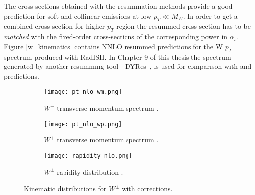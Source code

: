 	 The cross-sections obtained with the resummation methods provide a good prediction for soft and collinear emissions at low $p_T\ll M_W$. In order to get a combined cross-section for higher $p_T$ region the resummed cross-section has to be \textit{matched} with the fixed-order cross-sections of the corresponding power in $\alpha_s$. Figure \ref{w_kinematics} contains NNLO resummed predictions for the W $p_T$ spectrum produced with RadISH\cite{Radish}. In Chapter 9 of this thesis the spectrum generated by another resumming tool - DYRes~\cite{dyres}, is used for comparison with \Powheg and \Sherpa predictions.
	 \begin{figure}[htbp]
	 	\begin{subfigure}[t]{0.31\textwidth} 
	 		\texttt{[image: pt\_nlo\_wm.png]}
	 		\caption[Transverse view]{$W^{-}$ transverse momentum spectrum \cite{Bizon:2019zgf}.}
	 		\label{fig::wm_pt}
	 	\end{subfigure}
	 	\begin{subfigure}[t]{0.31\textwidth}
	 		\texttt{[image: pt\_nlo\_wp.png]}
	 		\caption[Side view]{$W^{+}$ transverse momentum spectrum \cite{Bizon:2019zgf}.}
	 		\label{fig::wp_pt}
	 	\end{subfigure}
	 	\hfill
	 		\begin{subfigure}[t]{0.36\textwidth}
	 		\texttt{[image: rapidity\_nlo.png]}
	 		\caption[Side view]{$W^{\pm}$ rapidity distribution \cite{Anastasiou:2003ds}.}
	 		\label{fig::w_rapid}
	 	\end{subfigure}
	 	\caption{Kinematic distributions for $W^{\pm}$ with corrections.}
	 	\label{fig::w_kinematics}
	 \end{figure}
